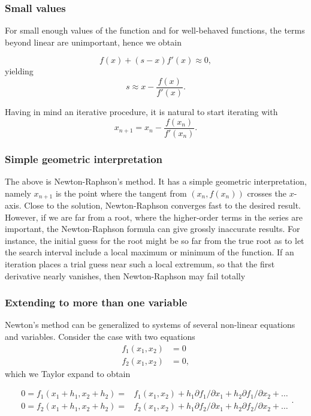 \documentclass{beamer}
\begin{document}
\begin{frame}
\frametitle{Small values}

For small enough values of the function and for well-behaved
functions, the terms beyond linear are unimportant, hence we obtain

\[
   f(x)+(s-x)f'(x)\approx 0,
\]
yielding
\[
   s\approx x-\frac{f(x)}{f'(x)}.
\]

Having in mind an iterative procedure, it is natural to start iterating with
\[
   x_{n+1}=x_n-\frac{f(x_n)}{f'(x_n)}.
\]
\end{frame}

\begin{frame}
\frametitle{Simple geometric interpretation}

The above is Newton-Raphson's method. It has a simple geometric
interpretation, namely $x_{n+1}$ is the point where the tangent from
$(x_n,f(x_n))$ crosses the $x$-axis.  Close to the solution,
Newton-Raphson converges fast to the desired result. However, if we
are far from a root, where the higher-order terms in the series are
important, the Newton-Raphson formula can give grossly inaccurate
results. For instance, the initial guess for the root might be so far
from the true root as to let the search interval include a local
maximum or minimum of the function.  If an iteration places a trial
guess near such a local extremum, so that the first derivative nearly
vanishes, then Newton-Raphson may fail totally
\end{frame}

\begin{frame}
\frametitle{Extending to more than one variable}

Newton's method can be generalized to systems of several non-linear equations
and variables. Consider the case with two equations
\[
   \begin{array}{cc} f_1(x_1,x_2) &=0\\
                     f_2(x_1,x_2) &=0,\end{array}
\]
which we Taylor expand to obtain

\[
   \begin{array}{cc} 0=f_1(x_1+h_1,x_2+h_2)=&f_1(x_1,x_2)+h_1
                     \partial f_1/\partial x_1+h_2
                     \partial f_1/\partial x_2+\dots\\
                     0=f_2(x_1+h_1,x_2+h_2)=&f_2(x_1,x_2)+h_1
                     \partial f_2/\partial x_1+h_2
                     \partial f_2/\partial x_2+\dots
                       \end{array}.
\]
\end{frame}
\end{document}
